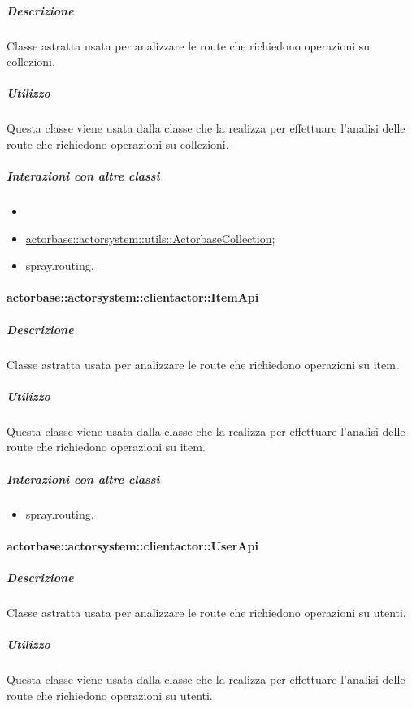 \documentclass{scalatekids-article}
\begin{document}
\subparagraph{Descrizione}

Classe astratta usata per analizzare le route che richiedono operazioni su collezioni.

\subparagraph{Utilizzo}

Questa classe viene usata dalla classe che la realizza per effettuare l'analisi
delle route che richiedono operazioni su collezioni.

\subparagraph{Interazioni con altre classi}

\begin{itemize}
\item \item \hyperref[sec:actorbase::actorsystem::utils::ActorbaseCollection]{actorbase::actorsystem::utils::ActorbaseCollection};
\item spray.routing.
\end{itemize}

\paragraph{actorbase::actorsystem::clientactor::ItemApi}
\label{sec:actorbase::actorsystem::clientactor::ItemApi}

\subparagraph{Descrizione}

Classe astratta usata per analizzare le route che richiedono operazioni su item.

\subparagraph{Utilizzo}

Questa classe viene usata dalla classe che la realizza per effettuare l'analisi
delle route che richiedono operazioni su item.

\subparagraph{Interazioni con altre classi}

\begin{itemize}
\item spray.routing.
\end{itemize}

\paragraph{actorbase::actorsystem::clientactor::UserApi}
\label{sec:actorbase::actorsystem::clientactor::UserApi}

\subparagraph{Descrizione}

Classe astratta usata per analizzare le route che richiedono operazioni su utenti.

\subparagraph{Utilizzo}

Questa classe viene usata dalla classe che la realizza per effettuare l'analisi
delle route che richiedono operazioni su utenti.
\end{document}
